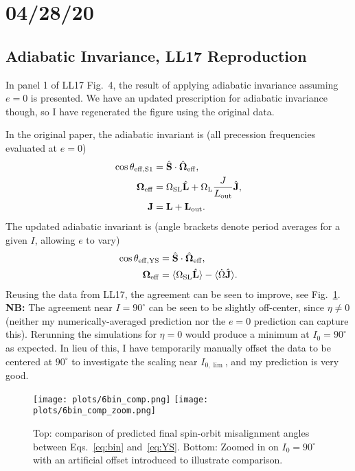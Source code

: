 \documentclass[10pt,
        usenames, %
        dvipsnames, %
    ]{article}
\newcommand*{\bm}[1]{\boldsymbol{\mathbf{#1}}}
\newcommand*{\uv}[1]{\hat{\bm{#1}}}
\newcommand*{\ev}[1]{\langle#1\rangle}
\begin{document}
\def\Snospace~{\S{}} %
\renewcommand*{\sectionautorefname}{\Snospace}
\renewcommand*{\appendixautorefname}{\Snospace}
\renewcommand*{\figureautorefname}{Fig.}
\renewcommand*{\equationautorefname}{Eq.}
\renewcommand*{\tableautorefname}{Tab.}

\singlespacing

\section{04/28/20}

\subsection{Adiabatic Invariance, LL17 Reproduction}

In panel 1 of LL17 Fig.~4, the result of applying adiabatic invariance assuming
$e = 0$ is presented. We have an updated prescription for adiabatic invariance
though, so I have regenerated the figure using the original data.

In the original paper, the adiabatic invariant is (all precession frequencies
evaluated at $e = 0$)
\begin{align}
    \cos \theta_{\rm eff, S1} &= \uv{S} \cdot \uv{\Omega}_{\rm
        eff},\label{eq:bin}\\
    \bm{\Omega}_{\rm eff} &= \Omega_{\rm SL} \uv{L}
        + \Omega_{\rm L}\frac{J}{L_{\rm out}} \uv{J},\\
    \bm{J} &= \bm{L} + \bm{L}_{\rm out}.
\end{align}
The updated adiabatic invariant is (angle brackets denote period averages for a
given $I$, allowing $e$ to vary)
\begin{align}
    \cos \theta_{\rm eff, YS} &= \uv{S} \cdot \uv{\Omega}_{\rm eff},
        \label{eq:YS}\\
    \bm{\Omega}_{\rm eff} &= \ev{\Omega_{\rm SL}\uv{L}}
        - \ev{\dot{\Omega}\uv{J}}.
\end{align}
Reusing the data from LL17, the agreement can be seen to improve, see
Fig.~\ref{fig:bin_comp}. \textbf{NB:} The agreement near $I = 90^\circ$ can be
seen to be slightly off-center, since $\eta \neq 0$ (neither my
numerically-averaged prediction nor the $e=0$ prediction can capture this).
Rerunning the simulations for $\eta = 0$ would produce a minimum at $I_0 =
90^\circ$ as expected. In lieu of this, I have temporarily manually offset the
data to be centered at $90^\circ$ to investigate the scaling near $I_{0,\lim}$,
and my prediction is very good.
\begin{figure}
    \centering
    \texttt{[image: plots/6bin\_comp.png]}
    \texttt{[image: plots/6bin\_comp\_zoom.png]}
    \caption{Top: comparison of predicted final spin-orbit misalignment angles
    between Eqs.~\eqref{eq:bin} and~\eqref{eq:YS}. Bottom: Zoomed in on $I_0 =
    90^\circ$ with an artificial offset introduced to illustrate
    comparison.}\label{fig:bin_comp}
\end{figure}
\end{document}
